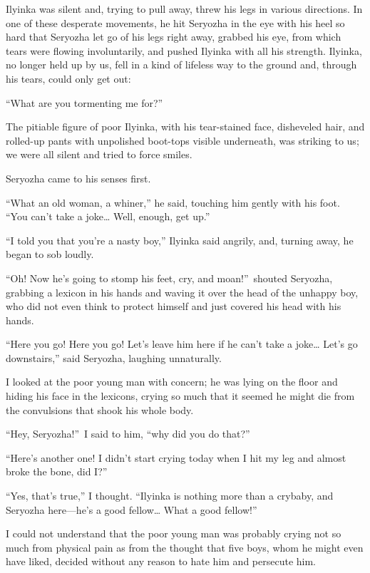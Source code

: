 Ilyinka was silent and, trying to pull away, threw his legs in various directions. In one of these desperate movements, he hit Seryozha in the eye with his heel so hard that Seryozha let go of his legs right away, grabbed his eye, from which tears were flowing involuntarily, and pushed Ilyinka with all his strength. Ilyinka, no longer held up by us, fell in a kind of lifeless way to the ground and, through his tears, could only get out:

``What are you tormenting me for?'' %

The pitiable figure of poor Ilyinka, with his tear-stained face, disheveled hair, and rolled-up pants with unpolished boot-tops visible underneath, was striking to us; we were all silent and tried to force smiles.

Seryozha came to his senses first.

``What an old woman, a whiner,'' he said, touching him gently with his foot. ``You can't take a joke\ldots{} Well, enough, get up.'' %

``I told you that you're a nasty boy,'' Ilyinka said angrily, and, turning away, he began to sob loudly. %

``Oh! Now he's going to stomp his feet, cry, and moan!''~shouted Seryozha, grabbing a lexicon in his hands and waving it over the head of the unhappy boy, who did not even think to protect himself and just covered his head with his hands.

``Here you go! Here you go! Let's leave him here if he can't take a joke\ldots{} Let's go downstairs,'' said Seryozha, laughing unnaturally. %

I looked at the poor young man with concern; he was lying on the floor and hiding his face in the lexicons, crying so much that it seemed he might die from the convulsions that shook his whole body.

``Hey, Seryozha!''~I said to him, ``why did you do that?'' %

``Here's another one! I didn't start crying today when I hit my leg and almost broke the bone, did I?'' %

``Yes, that's true,'' I thought. ``Ilyinka is nothing more than a crybaby, and Seryozha here---he's a good fellow\ldots{} What a good fellow!'' %

I could not understand that the poor young man was probably crying not so much from physical pain as from the thought that five boys, whom he might even have liked, decided without any reason to hate him and persecute him.

